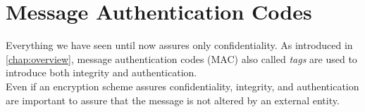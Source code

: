\section{Message Authentication Codes}
Everything we have seen until now assures only confidentiality. As introduced in \autoref{chap:overview}, message authentication codes (MAC) also called \emph{tags} are used to introduce both integrity and authentication.\\
Even if an encryption scheme assures confidentiality, integrity, and authentication are important to assure that the message is not altered by an external entity.
